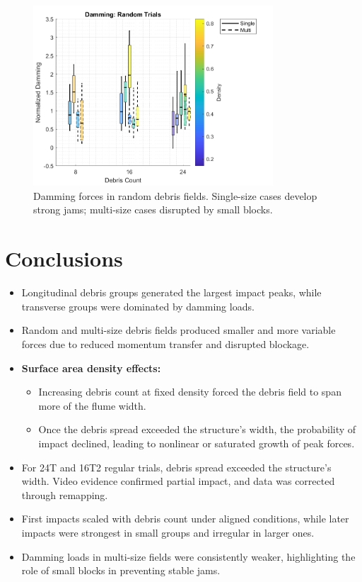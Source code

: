 \documentclass{article}
\begin{document}
\begin{figure}[htbp]
    \centering
    \includegraphics[width=0.8\textwidth]{Damming_Random_Single_vs_Multi_ByDensityGradient.png}
    \caption{Damming forces in random debris fields. Single-size cases develop strong jams; multi-size cases disrupted by small blocks.}
    \label{fig:damming_random}
\end{figure}

\section{Conclusions}
\begin{itemize}
    \item Longitudinal debris groups generated the largest impact peaks, while transverse groups were dominated by damming loads.
    \item Random and multi-size debris fields produced smaller and more variable forces due to reduced momentum transfer and disrupted blockage.
    \item \textbf{Surface area density effects:}
    \begin{itemize}
        \item Increasing debris count at fixed density forced the debris field to span more of the flume width.
        \item Once the debris spread exceeded the structure’s width, the probability of impact declined, leading to nonlinear or saturated growth of peak forces.
    \end{itemize}
    \item For 24T and 16T2 regular trials, debris spread exceeded the structure’s width. Video evidence confirmed partial impact, and data was corrected through remapping.
    \item First impacts scaled with debris count under aligned conditions, while later impacts were strongest in small groups and irregular in larger ones.
    \item Damming loads in multi-size fields were consistently weaker, highlighting the role of small blocks in preventing stable jams.
\end{itemize}
\end{document}
